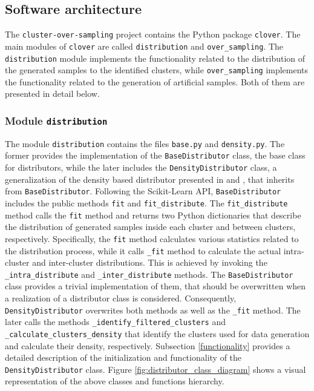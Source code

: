 \documentclass[preprint,12pt, a4paper]{elsarticle}
\begin{document}
\subsection{Software architecture}
\label{architecture}

The \texttt{cluster-over-sampling} project contains the Python package \texttt{clover}. The main modules of \texttt{clover} are called \texttt{distribution} and \texttt{over\_sampling}. The \texttt{distribution} module implements the functionality related to the distribution of the generated samples to the identified clusters, while \texttt{over\_sampling} implements the functionality related to the generation of artificial samples. Both of them are presented in detail below.

\subsubsection{Module \texttt{distribution}}
\label{distribution}

The module \texttt{distribution} contains the files \texttt{base.py} and \texttt{density.py}. The former provides the implementation of the \texttt{BaseDistributor} class, the base class for distributors, while the later includes the \texttt{DensityDistributor} class, a generalization of the density based distributor presented in \cite{Douzas2017a} and \cite{Douzas2018}, that inherits from \texttt{BaseDistributor}. Following the Scikit-Learn API, \texttt{BaseDistributor} includes the public methods \texttt{fit} and \texttt{fit\_distribute}. The \texttt{fit\_distribute} method calls the \texttt{fit} method and returns two Python dictionaries that describe the distribution of generated samples inside each cluster and between clusters, respectively. Specifically, the \texttt{fit} method calculates various statistics related to the distribution process, while it calls \texttt{\_fit} method to calculate the actual intra-cluster and inter-cluster distributions. This is achieved by invoking the \texttt{\_intra\_distribute} and \texttt{\_inter\_distribute} methods. The \texttt{BaseDistributor} class provides a trivial implementation of them, that should be overwritten when a realization of a distributor class is considered. Consequently, \texttt{DensityDistributor} overwrites both methods as well as the \texttt{\_fit} method. The later calls the methods \texttt{\_identify\_filtered\_clusters} and \texttt{\_calculate\_clusters\_density} that identify the clusters used for data generation and calculate their density, respectively. Subsection \ref{functionality} provides a detailed description of the initialization and functionality of the \texttt{DensityDistributor} class. Figure \ref{fig:distributor_class_diagram} shows a visual representation of the above classes and functions hierarchy.
\end{document}
